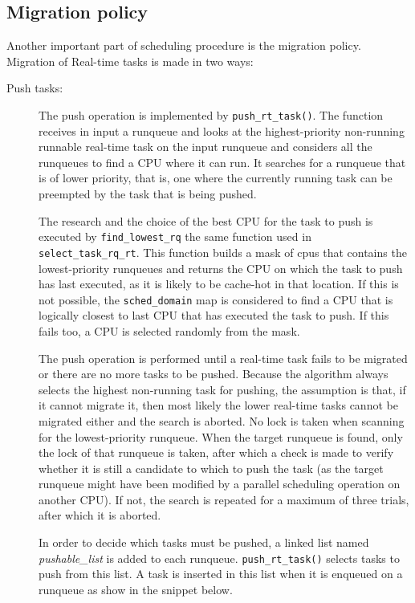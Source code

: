 \subsection{Migration policy}

Another important part of scheduling procedure is the migration policy. Migration of Real-time tasks is made in two ways: 

\begin{description}
\item[Push tasks:] The push operation is implemented by \texttt{push\_rt\_task()}. The function receives in input a runqueue and looks at the 
highest-priority non-running runnable real-time task on the input runqueue and
considers all the runqueues to find a CPU where it can run. It 
searches for a runqueue that is of lower priority, that is, one where the currently running task can be preempted by the task that is being pushed. 

The research and the choice of the best CPU for the task to push is executed by \texttt{find\_lowest\_rq} the same function used in 
\texttt{select\_task\_rq\_rt}. This function builds a mask of cpus that contains
the lowest-priority runqueues and returns the CPU on which the task 
to push has last executed, as it is likely to be cache-hot in that location. If this is not possible, the \texttt{sched\_domain} map is considered 
to find a CPU that is logically closest to last CPU that has executed the task
to push. If this fails too, a CPU is selected randomly from the mask.

The push operation is performed until a real-time task fails to be migrated or there are no more tasks to be pushed. Because the algorithm always 
selects the highest non-running task for pushing, the assumption is that, if it cannot migrate it, then most likely the lower real-time tasks cannot 
be migrated either and the search is aborted. No lock is taken when scanning for the lowest-priority runqueue. When the target runqueue is found, 
only the lock of that runqueue is taken, after which a check is made to verify whether it is still a candidate to which to push the task (as the 
target runqueue might have been modified by a parallel scheduling operation on another CPU). If not, the search is repeated for a maximum of three 
trials, after which it is aborted. 

In order to decide which tasks must be pushed, a linked list named \textit{pushable\_list} is added to each runqueue. \texttt{push\_rt\_task()} 
selects tasks to push from this list. A task is inserted in this list when it is enqueued on a runqueue as show in the snippet below.


\end{description}
